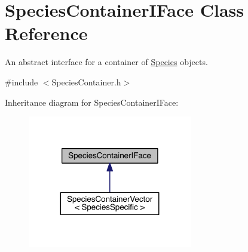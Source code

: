 \hypertarget{classSpeciesContainerIFace}{\section{Species\+Container\+I\+Face Class Reference}
\label{classSpeciesContainerIFace}
}


An abstract interface for a container of \hyperlink{classSpecies}{Species} objects.  




{\ttfamily \#include $<$Species\+Container.\+h$>$}



Inheritance diagram for Species\+Container\+I\+Face\+:\nopagebreak
\begin{figure}[H]
\begin{center}
\leavevmode
\includegraphics[width=203pt]{classSpeciesContainerIFace__inherit__graph}
\end{center}
\end{figure}
